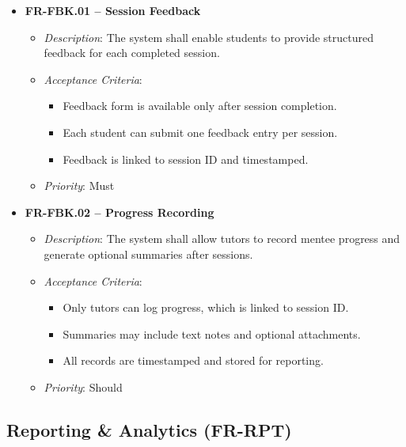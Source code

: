 \begin{itemize}
    \item \textbf{FR-FBK.01 – Session Feedback}
        \begin{itemize}
            \item \textit{Description}: The system shall enable students to provide structured feedback for each completed session.
            \item \textit{Acceptance Criteria}:
                \begin{itemize}
                    \item Feedback form is available only after session completion.
                    \item Each student can submit one feedback entry per session.
                    \item Feedback is linked to session ID and timestamped.
                \end{itemize}
            \item \textit{Priority}: Must
        \end{itemize}

    \item \textbf{FR-FBK.02 – Progress Recording}
    \begin{itemize}
        \item \textit{Description}: The system shall allow tutors to record mentee progress and generate optional summaries after sessions.
        \item \textit{Acceptance Criteria}:
            \begin{itemize}
                \item Only tutors can log progress, which is linked to session ID.
                \item Summaries may include text notes and optional attachments.
                \item All records are timestamped and stored for reporting.
            \end{itemize}  
        \item \textit{Priority}: Should
    \end{itemize}

\end{itemize}

\subsection{Reporting \& Analytics (FR-RPT)}

